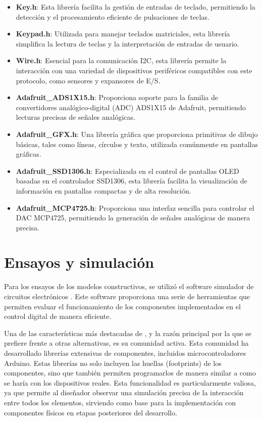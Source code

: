 \begin{itemize}
    \item \textbf{Key.h}: Esta librería facilita la gestión de entradas de teclado, permitiendo la detección y el procesamiento eficiente de pulsaciones de teclas.
    \item \textbf{Keypad.h}: Utilizada para manejar teclados matriciales, esta librería simplifica la lectura de teclas y la interpretación de entradas de usuario.
    \item \textbf{Wire.h}: Esencial para la comunicación I2C, esta librería permite la interacción con una variedad de dispositivos periféricos compatibles con este protocolo, como sensores y expansores de E/S.
    \item \textbf{Adafruit\_ADS1X15.h}: Proporciona soporte para la familia de convertidores analógico-digital (ADC) ADS1X15 de Adafruit, permitiendo lecturas precisas de señales analógicas.
    \item \textbf{Adafruit\_GFX.h}: Una librería gráfica que proporciona primitivas de dibujo básicas, tales como líneas, círculos y texto, utilizada comúnmente en pantallas gráficas.
    \item \textbf{Adafruit\_SSD1306.h}: Especializada en el control de pantallas OLED basadas en el controlador SSD1306, esta librería facilita la visualización de información en pantallas compactas y de alta resolución.
    \item \textbf{Adafruit\_MCP4725.h}: Proporciona una interfaz sencilla para controlar el DAC MCP4725, permitiendo la generación de señales analógicas de manera precisa.
\end{itemize}

\section{Ensayos y simulación}
Para los ensayos de los modelos constructivos, se utilizó el software simulador de circuitos electrónicos . Este software proporciona una serie de herramientas que permiten evaluar el funcionamiento de los componentes implementados en el control digital de manera eficiente. \par 
Una de las características más destacadas de , y la razón principal por la que se prefiere frente a otras alternativas, es su comunidad activa. Esta comunidad ha desarrollado librerías extensivas de componentes, incluidos microcontroladores Arduino. Estas librerías no solo incluyen las huellas (footprints) de los componentes, sino que también permiten programarlos de manera similar a como se haría con los dispositivos reales. Esta funcionalidad es particularmente valiosa, ya que permite al diseñador observar una simulación precisa de la interacción entre todos los elementos, sirviendo como base para la implementación con componentes físicos en etapas posteriores del desarrollo.

